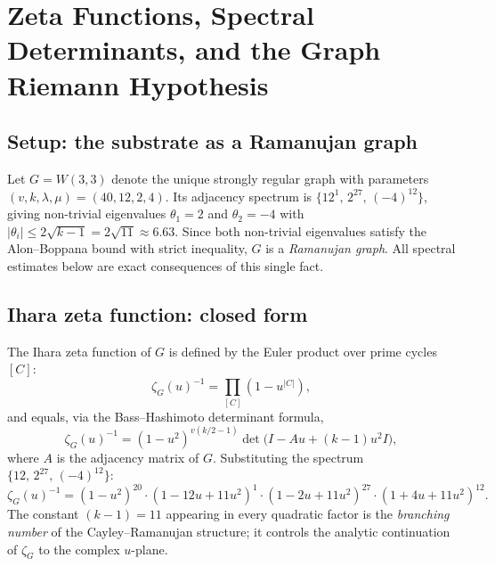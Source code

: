 
\section{Zeta Functions, Spectral Determinants, and the Graph Riemann Hypothesis}
\label{sec:zeta}

\subsection{Setup: the substrate as a Ramanujan graph}
\label{sec:zeta_ramanujan}

Let $G = W(3,3)$ denote the unique strongly regular graph with parameters
$(v,k,\lambda,\mu)=(40,12,2,4)$.
Its adjacency spectrum is $\{12^1,\,2^{27},\,(-4)^{12}\}$, giving
non-trivial eigenvalues $\theta_1 = 2$ and $\theta_2 = -4$ with
$|\theta_i| \le 2\sqrt{k-1} = 2\sqrt{11}\approx 6.63$.
Since both non-trivial eigenvalues satisfy the Alon--Boppana bound with
strict inequality, $G$ is a \emph{Ramanujan graph}\cite{LubotzkyPhillipsSarnak1988}.
All spectral estimates below are exact consequences of this single fact.

\subsection{Ihara zeta function: closed form}
\label{sec:zeta_ihara}

The Ihara zeta function of $G$ is defined by the Euler product over prime
cycles $[C]$:
\begin{equation}
  \zeta_G(u)^{-1} = \prod_{[C]}(1 - u^{|C|}),
  \label{eq:ihara_euler}
\end{equation}
and equals, via the Bass--Hashimoto determinant formula\cite{Bass1992},
\begin{equation}
  \zeta_G(u)^{-1} = (1-u^2)^{v(k/2-1)}\det\!\bigl(I - Au + (k-1)u^2 I\bigr),
  \label{eq:ihara_bass}
\end{equation}
where $A$ is the adjacency matrix of $G$.
Substituting the spectrum $\{12,\,2^{27},\,(-4)^{12}\}$:
\begin{equation}
  \zeta_G(u)^{-1} =
  (1-u^2)^{20}\cdot
  (1-12u+11u^2)^1\cdot
  (1-2u+11u^2)^{27}\cdot
  (1+4u+11u^2)^{12}.
  \label{eq:ihara_closed}
\end{equation}
The constant $(k-1)=11$ appearing in every quadratic factor is the
\emph{branching number} of the Cayley--Ramanujan structure; it controls
the analytic continuation of $\zeta_G$ to the complex $u$-plane.

